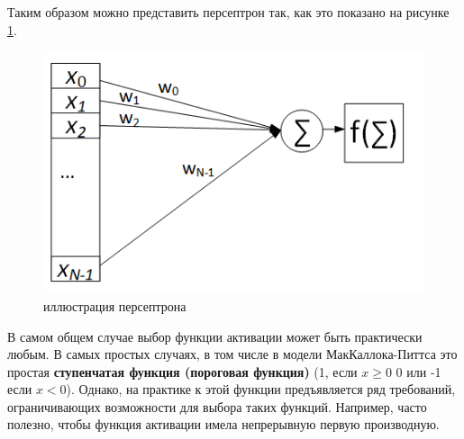 \documentclass[12pt]{article}
\begin{document}
\begin{sloppypar}
Таким  образом можно представить персептрон так, как это показано на рисунке \ref{ch1:fig:1_1}.
    \begin{figure}[!h]
    	\begin{center}
    		\includegraphics[width=0.5\linewidth]{./figuresch1/perceptron.png}
    		\caption{иллюстрация персептрона}		
    		\label{ch1:fig:1_1}
    	\end{center}
    \end{figure}
В самом общем случае выбор функции активации может быть практически любым. В самых простых случаях, в том числе в модели МакКаллока-Питтса это простая \textbf{ступенчатая функция (пороговая функция)} (1, если $x\geq 0$ 0 или -1 если $x<0$). Однако, на практике к этой функции предъявляется ряд требований, ограничивающих возможности для выбора таких функций. Например, часто полезно, чтобы функция активации имела непрерывную первую производную. 


\end{sloppypar}
\end{document}

